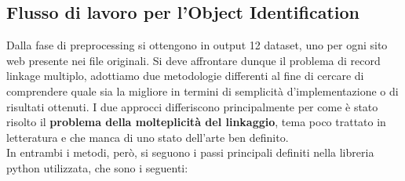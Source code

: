 \documentclass[a4paper,12pt]{article}
\begin{document}
\newpage
\subsection{Flusso di lavoro per l'Object Identification}
Dalla fase di preprocessing si ottengono in output 12 dataset, uno per ogni sito web presente nei file originali. Si deve affrontare dunque il problema di record linkage multiplo, adottiamo due metodologie differenti al fine di cercare di comprendere quale sia la migliore in termini di semplicità d'implementazione o di risultati ottenuti. I due approcci differiscono principalmente per come è stato risolto il \textbf{problema della molteplicità del linkaggio}, tema poco trattato in letteratura e che manca di uno stato dell'arte ben definito. \\

\noindent In entrambi i metodi, però, si seguono i passi principali definiti nella libreria python utilizzata, che sono i seguenti:
\end{document}
